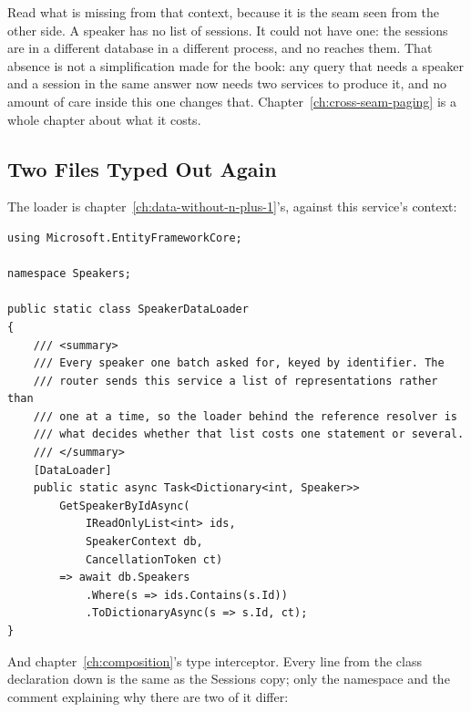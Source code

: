 %
Read what is missing from that context, because it is the seam seen from the
other side. A speaker has no list of sessions. It could not have one: the
sessions are in a different database in a different process, and no
 reaches them. That absence is not a simplification made for the
book: any query that needs a speaker and a session in the same answer now needs
two services to produce it, and no amount of care inside this one changes that.
Chapter~\ref{ch:cross-seam-paging} is a whole chapter about what it costs.

\subsection{Two Files Typed Out Again}

%
The loader is chapter~\ref{ch:data-without-n-plus-1}'s, against this service's
context:

\begin{verbatim}
using Microsoft.EntityFrameworkCore;

namespace Speakers;

public static class SpeakerDataLoader
{
    /// <summary>
    /// Every speaker one batch asked for, keyed by identifier. The
    /// router sends this service a list of representations rather than
    /// one at a time, so the loader behind the reference resolver is
    /// what decides whether that list costs one statement or several.
    /// </summary>
    [DataLoader]
    public static async Task<Dictionary<int, Speaker>>
        GetSpeakerByIdAsync(
            IReadOnlyList<int> ids,
            SpeakerContext db,
            CancellationToken ct)
        => await db.Speakers
            .Where(s => ids.Contains(s.Id))
            .ToDictionaryAsync(s => s.Id, ct);
}
\end{verbatim}

%
And chapter~\ref{ch:composition}'s type interceptor. Every line from the class
declaration down is the same as the Sessions copy; only the namespace and the
comment explaining why there are two of it differ:


